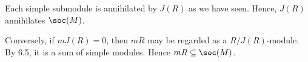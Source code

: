 Each simple submodule is annihilated by $J(R)$ as we have seen. Hence,
$J(R)$ annihilates $\soc(M)$.

Conversely, if $mJ(R) = 0$, then $mR$ may be regarded as a $R/J(R)$-module.
By 6.5, it is a sum of simple modules. Hence $mR \subseteq \soc(M)$.

